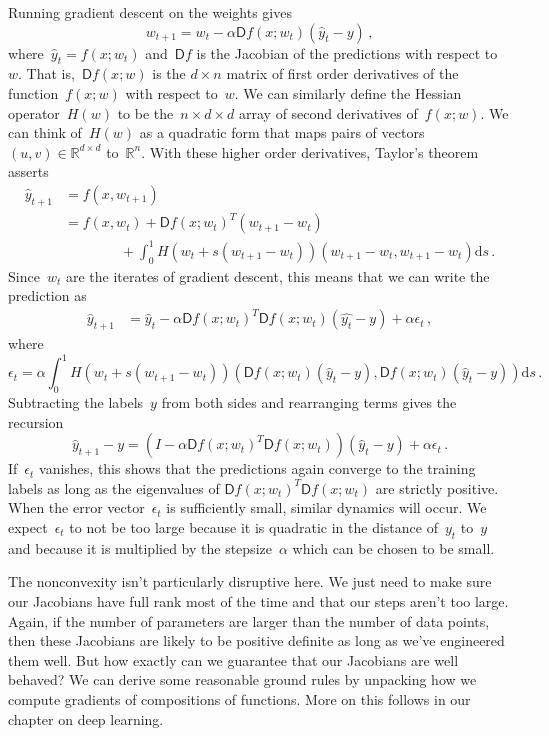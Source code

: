 \documentclass{tufte-book}
\begin{document}
Running gradient descent on the weights gives \[
    w_{t+1}
    = w_t - \alpha \mathsf{D} f (x;w_t)(\hat{y}_t - y)\,,
\] where~\(\hat y_t=f(x;w_t)\) and~\(\mathsf{D} f\) is the Jacobian of
the predictions with respect to~\(w\). That is,~\(\mathsf{D} f (x;w)\)
is the \(d\times n\) matrix of first order derivatives of the
function~\(f(x;w)\) with respect to~\(w\). We can similarly define the
Hessian operator~\(H(w)\) to be the~\(n \times d \times d\) array of
second derivatives of~\(f(x;w)\). We can think of~\(H(w)\) as a
quadratic form that maps pairs of vectors
\((u,v) \in \mathbb{R}^{d\times d}\) to~\(\mathbb{R}^n\). With these
higher order derivatives, Taylor's theorem asserts \[
\begin{aligned}
    \hat{y}_{t+1} &= f(x,w_{t+1})\\
    &= f(x,w_t) +  \mathsf{D} f (x;w_t)^T(w_{t+1}-w_t) \\
    &\qquad\qquad+  \int_0^1 H(w_t+s (w_{t+1}-w_t))  (w_{t+1}-w_t, w_{t+1}-w_t) \mathrm{d} s\,.
\end{aligned}
\] Since~\(w_t\) are the iterates of gradient descent, this means that
we can write the prediction as \[
\begin{aligned}
    \hat{y}_{t+1}   &= \hat{y}_t -\alpha \mathsf{D} f(x;w_t)^T \mathsf{D} f(x;w_t)(\hat{y_t} - y)
            + \alpha \epsilon_t \,,
\end{aligned}
\] where \[
\epsilon_t = \alpha \int_0^1 H(w_t+s (w_{t+1}-w_t))
    \left( \mathsf{D} f(x;w_t) (\hat{y}_t - y),\mathsf{D} f(x;w_t) (\hat{y}_t - y)\right)\mathrm{d} s\,.
\] Subtracting the labels~\(y\) from both sides and rearranging terms
gives the recursion \[
    \hat{y}_{t+1}-y = (I -  \alpha \mathsf{D} f(x;w_t)^T \mathsf{D} f(x;w_t))(\hat{y}_t - y) + \alpha \epsilon_t\,.
\] If~\(\epsilon_t\) vanishes, this shows that the predictions again
converge to the training labels as long as the eigenvalues of
\(\mathsf{D} f(x;w_t)^T \mathsf{D} f(x;w_t)\) are strictly positive.
When the error vector~\(\epsilon_t\) is sufficiently small, similar
dynamics will occur. We expect~\(\epsilon_t\) to not be too large
because it is quadratic in the distance of~\(y_t\) to~\(y\) and because
it is multiplied by the stepsize~\(\alpha\) which can be chosen to be
small.

The nonconvexity isn't particularly disruptive here. We just need to
make sure our Jacobians have full rank most of the time and that our
steps aren't too large. Again, if the number of parameters are larger
than the number of data points, then these Jacobians are likely to be
positive definite as long as we've engineered them well. But how exactly
can we guarantee that our Jacobians are well behaved? We can derive some
reasonable ground rules by unpacking how we compute gradients of
compositions of functions. More on this follows in our chapter on deep
learning.
\end{document}
